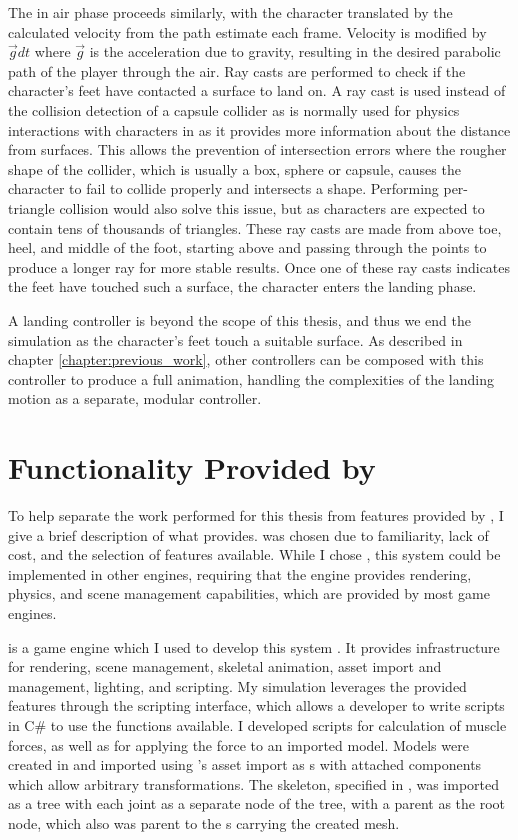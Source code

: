 The in air phase proceeds similarly, with the character translated by the calculated velocity from the path estimate each frame.  Velocity is modified by $\vec{g} dt$ where $\vec{g}$ is the acceleration due to gravity, resulting in the desired parabolic path of the player through the air.  Ray casts are performed to check if the character's feet have contacted a surface to land on.  A ray cast is used instead of the collision detection of a capsule collider as is normally used for physics interactions with characters in \unity as it provides more information about the distance from surfaces.  This allows the prevention of intersection errors where the rougher shape of the collider, which is usually a box, sphere or capsule, causes the character to fail to collide properly and intersects a shape.  Performing per-triangle collision would also solve this issue, but as characters are expected to contain tens of thousands of triangles.  These ray casts are made from above toe, heel, and middle of the foot, starting above and passing through the points to produce a longer ray for more stable results.  Once one of these ray casts indicates the feet have touched such a surface, the character enters the landing phase.

A landing controller is beyond the scope of this thesis, and thus we end the simulation as the character's feet touch a suitable surface.  As described in chapter \ref{chapter:previous_work}, other controllers can be composed with this controller to produce a full animation, handling the complexities of the landing motion as a separate, modular controller.


\section{Functionality Provided by \unity{}}
\label{section:unity}
	To help separate the work performed for this thesis from features provided by \unity{}, I give a brief description of what \unity{} provides.  \unity{} was chosen due to familiarity, lack of cost, and the selection of features available.  While I chose \unity{}, this system could be implemented in other engines, requiring that the engine provides rendering, physics, and scene management capabilities, which are provided by most game engines.
	
	\unity{} is a game engine which I used to develop this system \cite{unity}.  It provides infrastructure for rendering, scene management, skeletal animation, asset import and management, lighting, and scripting.  My simulation leverages the provided features through the \unity{} scripting interface, which allows a developer to write scripts in C\# to use the functions available.  I developed scripts for calculation of muscle forces, as well as for applying the force to an imported model.  Models were created in \maya{} and imported using \unity{}'s asset import as \unity{} s with attached  components which allow arbitrary transformations.  The skeleton, specified in \maya{}, was imported as a tree with each joint as a separate  node of the tree, with a parent  as the root node, which also was parent to the s carrying the created mesh.
	
